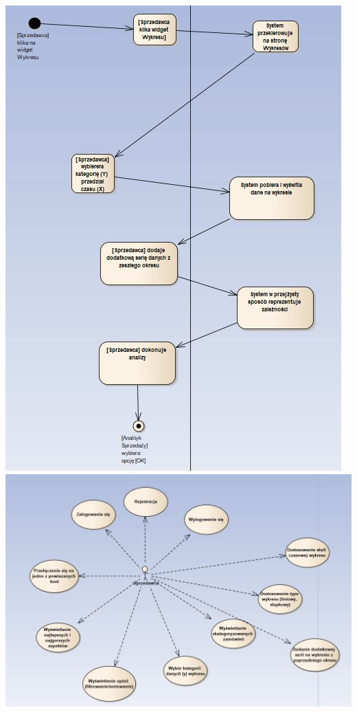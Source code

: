 \documentclass[a4paper,11pt]{article}
\begin{document}
\includegraphics[scale=0.5]{src/u3.png}\\
\includegraphics[scale=0.5]{src/u4.png}\\
\end{document}
